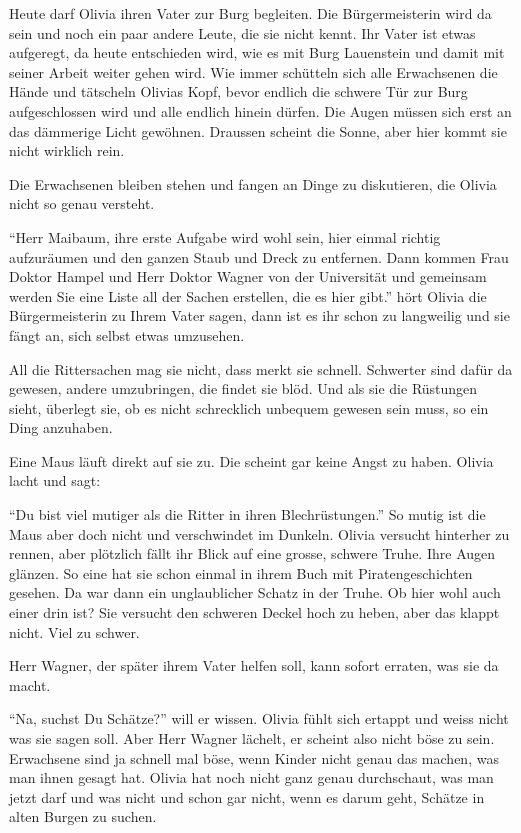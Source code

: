 Heute darf Olivia ihren Vater zur Burg begleiten. Die Bürgermeisterin wird da sein und noch ein paar andere Leute, die sie nicht kennt. Ihr Vater ist etwas aufgeregt, da heute entschieden wird, wie es mit Burg Lauenstein und damit mit seiner Arbeit weiter gehen wird. Wie immer schütteln sich alle Erwachsenen die Hände und tätscheln Olivias Kopf, bevor endlich die schwere Tür zur Burg aufgeschlossen wird und alle endlich hinein dürfen. Die Augen müssen sich erst an das dämmerige Licht gewöhnen. Draussen scheint die Sonne, aber hier kommt sie nicht wirklich rein.

Die Erwachsenen bleiben stehen und fangen an Dinge zu diskutieren, die Olivia nicht so genau versteht. 

\enquote{Herr Maibaum, ihre erste Aufgabe wird wohl sein, hier einmal richtig aufzuräumen und den ganzen Staub und Dreck zu entfernen. Dann kommen Frau Doktor Hampel und Herr Doktor Wagner von der Universität und gemeinsam werden Sie eine Liste all der Sachen erstellen, die es hier gibt.} hört Olivia die Bürgermeisterin zu Ihrem Vater sagen, dann ist es ihr schon zu langweilig und sie fängt an, sich selbst etwas umzusehen.

All die Rittersachen mag sie nicht, dass merkt sie schnell. Schwerter sind dafür da gewesen, andere umzubringen, die findet sie blöd. Und als sie die Rüstungen sieht, überlegt sie, ob es nicht schrecklich unbequem gewesen sein muss, so ein Ding anzuhaben. 

Eine Maus läuft direkt auf sie zu. Die scheint gar keine Angst zu haben. Olivia lacht und sagt:

\enquote{Du bist viel mutiger als die Ritter in ihren Blechrüstungen.} So mutig ist die Maus aber doch nicht und verschwindet im Dunkeln. Olivia versucht hinterher zu rennen, aber plötzlich fällt ihr Blick auf eine grosse, schwere Truhe. Ihre Augen glänzen. So eine hat sie schon einmal in ihrem Buch mit Piratengeschichten gesehen. Da war dann ein unglaublicher Schatz in der Truhe. Ob hier wohl auch einer drin ist? Sie versucht den schweren Deckel hoch zu heben, aber das klappt nicht. Viel zu schwer. 

Herr Wagner, der später ihrem Vater helfen soll, kann sofort erraten, was sie da macht. 

\enquote{Na, suchst Du Schätze?} will er wissen. Olivia fühlt sich ertappt und weiss nicht was sie sagen soll. Aber Herr Wagner lächelt, er scheint also nicht böse zu sein. Erwachsene sind ja schnell mal böse, wenn Kinder nicht genau das machen, was man ihnen gesagt hat. Olivia hat noch nicht ganz genau durchschaut, was man jetzt darf und was nicht und schon gar nicht, wenn es darum geht, Schätze in alten Burgen zu suchen.

